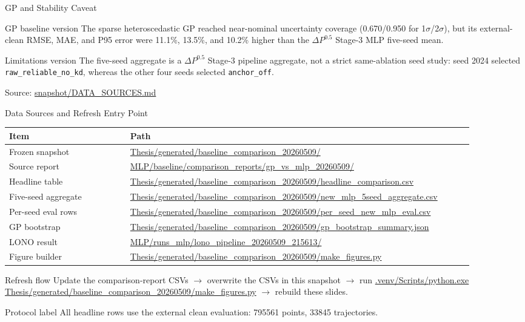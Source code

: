 \documentclass[aspectratio=169,11pt]{beamer}
\newcommand{\sourcepath}[1]{{\scriptsize\url{#1}}}
\newcommand{\sourcenote}[1]{\vfill{\tiny\textcolor{gray!70!black}{Source: \url{#1}}}}
\begin{document}
\begin{frame}{GP and Stability Caveat}
\small
\begin{block}{GP baseline version}
\footnotesize
The sparse heteroscedastic GP reached near-nominal uncertainty coverage (0.670/0.950 for 1\(\sigma\)/2\(\sigma\)),
but its external-clean RMSE, MAE, and P95 error were 11.1\%, 13.5\%, and 10.2\% higher than the \(\Delta P^{0.5}\)
Stage-3 MLP five-seed mean.
\end{block}

\begin{block}{Limitations version}
\footnotesize
The five-seed aggregate is a \(\Delta P^{0.5}\) Stage-3 pipeline aggregate, not a strict same-ablation seed study:
seed 2024 selected \texttt{raw\_reliable\_no\_kd}, whereas the other four seeds selected \texttt{anchor\_off}.
\end{block}

\sourcenote{snapshot/DATA_SOURCES.md}
\end{frame}

\begin{frame}{Data Sources and Refresh Entry Point}
\scriptsize
\begin{tabular}{L{0.24\linewidth}L{0.68\linewidth}}
\toprule
Item & Path \\
\midrule
Frozen snapshot &
\sourcepath{Thesis/generated/baseline_comparison_20260509/} \\
Source report &
\sourcepath{MLP/baseline/comparison_reports/gp_vs_mlp_20260509/} \\
Headline table &
\sourcepath{Thesis/generated/baseline_comparison_20260509/headline_comparison.csv} \\
Five-seed aggregate &
\sourcepath{Thesis/generated/baseline_comparison_20260509/new_mlp_5seed_aggregate.csv} \\
Per-seed eval rows &
\sourcepath{Thesis/generated/baseline_comparison_20260509/per_seed_new_mlp_eval.csv} \\
GP bootstrap &
\sourcepath{Thesis/generated/baseline_comparison_20260509/gp_bootstrap_summary.json} \\
LONO result &
\sourcepath{MLP/runs_mlp/lono_pipeline_20260509_215613/} \\
Figure builder &
\sourcepath{Thesis/generated/baseline_comparison_20260509/make_figures.py} \\
\bottomrule
\end{tabular}

\vspace{0.6em}
\begin{block}{Refresh flow}
\footnotesize
Update the comparison-report CSVs \(\rightarrow\) overwrite the CSVs in this snapshot
\(\rightarrow\) run
\sourcepath{.venv/Scripts/python.exe Thesis/generated/baseline_comparison_20260509/make_figures.py}
\(\rightarrow\) rebuild these slides.
\end{block}

\begin{block}{Protocol label}
\footnotesize
All headline rows use the external clean evaluation:
\num{795561} points, \num{33845} trajectories.
\end{block}
\end{frame}
\end{document}
